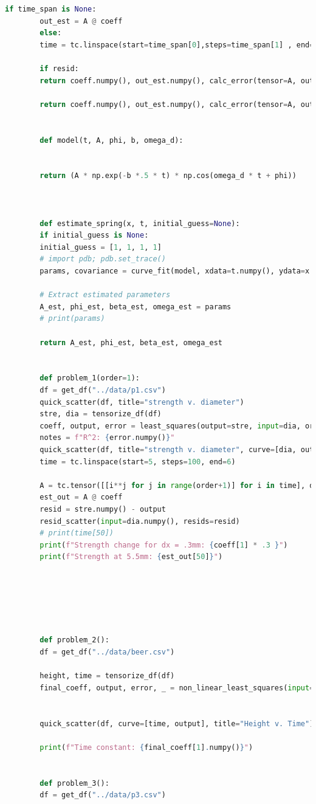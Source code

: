 \documentclass[]{report}
\begin{document}
\begin{lstlisting}[language=Python]
		if time_span is None:
		out_est = A @ coeff
		else:
		time = tc.linspace(start=time_span[0],steps=time_span[1] , end=time_span[2])
		
		if resid:
		return coeff.numpy(), out_est.numpy(), calc_error(tensor=A, output=output, coeff=coeff, resid=True)
		
		return coeff.numpy(), out_est.numpy(), calc_error(tensor=A, output=output, coeff=coeff)
		
		
		def model(t, A, phi, b, omega_d):
		
		
		return (A * np.exp(-b *.5 * t) * np.cos(omega_d * t + phi))
		
		
		
		def estimate_spring(x, t, initial_guess=None):
		if initial_guess is None:
		initial_guess = [1, 1, 1, 1]
		# import pdb; pdb.set_trace()
		params, covariance = curve_fit(model, xdata=t.numpy(), ydata=x.numpy(), p0=initial_guess)
		
		# Extract estimated parameters
		A_est, phi_est, beta_est, omega_est = params
		# print(params)
		
		return A_est, phi_est, beta_est, omega_est
		
		
		def problem_1(order=1):
		df = get_df("../data/p1.csv")
		quick_scatter(df, title="strength v. diameter")
		stre, dia = tensorize_df(df)
		coeff, output, error = least_squares(output=stre, input=dia, order=order)
		notes = f"R^2: {error.numpy()}"
		quick_scatter(df, title="strength v. diameter", curve=[dia, output], text=notes)
		time = tc.linspace(start=5, steps=100, end=6)
		
		A = tc.tensor([[i**j for j in range(order+1)] for i in time], dtype=tc.float)
		est_out = A @ coeff
		resid = stre.numpy() - output
		resid_scatter(input=dia.numpy(), resids=resid)
		# print(time[50])
		print(f"Strength change for dx = .3mm: {coeff[1] * .3 }")
		print(f"Strength at 5.5mm: {est_out[50]}")
		
		
		
		
		
		
		def problem_2():
		df = get_df("../data/beer.csv")
		
		height, time = tensorize_df(df)
		final_coeff, output, error, _ = non_linear_least_squares(input=time, output=height)
		
		
		quick_scatter(df, curve=[time, output], title="Height v. Time")
		
		print(f"Time constant: {final_coeff[1].numpy()}")
		
		
		def problem_3():
		df = get_df("../data/p3.csv")
		

\end{lstlisting}
\end{document}
